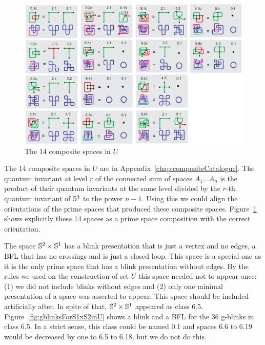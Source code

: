 \begin{figure}[h!tp]
   \begin{center}
      \leavevmode
      \includegraphics[width=16cm]{fig/compositeSpaces.eps}
   \end{center}
   \vspace{-0.7cm}
   \caption{ The 14 composite spaces in $U$}
   \label{fig:compositeSpaces}
\end{figure}

The 14 composite spaces in $U$ are in Appendix~\ref{chap:compositeCatalogue}.
The quantum invariant at level $r$ of the connected sum of spaces $A_1 \ldots A_n$ is the product
of their quantum invariants at the same level divided by the $r$-th quantum invariant of $\mathbb{S}^3$ to
the power $n-1$. Using this we could align the orientations of the prime spaces that
produced these composite spaces. Figure~\ref{fig:compositeSpaces} shows explicitly these
14 spaces as a prime space composition with the correct orientation.

The space $\mathbb{S}^2 \times \mathbb{S}^1$ has a blink presentation that is just a vertex
and no edges, \ie a BFL that has no crossings and is just a closed loop. This
space is a special one as it is the only prime space that has a blink presentation
without edges. By the rules we used on the construction of set $U$ this space
needed not to appear once: (1) we did not include blinks without edges and
(2) only one minimal presentation of a space was asserted to appear. This
space should be included artificially after. In spite of that, $\mathbb{S}^2 \times \mathbb{S}^1$
appeared as class 6.5. Figure~\ref{fig:gblinksForS1xS2inU} shows a blink
and a BFL for the 36 g-blinks in class 6.5. In a strict sense, this class
could be named 0.1 and spaces 6.6 to 6.19 would be decreased by one to 6.5
to 6.18, but we do not do this.

